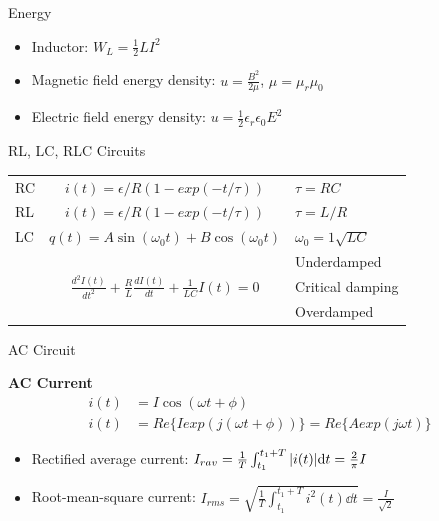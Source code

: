 \documentclass[9pt]{beamer}
\begin{document}
\begin{frame}{Energy}
    \begin{itemize}
        \item Inductor: $W_L = \frac{1}{2} L I^2$
        \item Magnetic field energy density: $u = \frac{B^2}{2 \mu}$, $\mu=\mu_r\mu_0$
        \item Electric field energy density: $u=\frac{1}{2}\epsilon_r\epsilon_0E^2$
    \end{itemize}
\end{frame}

\begin{frame}{RL, LC, RLC Circuits}
    \begin{table}[htbp]
        \centering
        \begin{tabular}{l c l}
            \toprule
            RC & $i(t)=\epsilon/R(1-exp(-t/\tau))$ & $\tau=RC$ \\ \addlinespace[1em]
            RL & $i(t)=\epsilon/R(1-exp(-t/\tau))$ & $\tau=L/R$ \\ \addlinespace[1em] 
            LC & $q(t) = A\sin(\omega_0 t) + B\cos(\omega_0 t)$ & $\omega_0 = 1\sqrt{LC}$\\ \addlinespace[1em]
            \multirow{3}{*}{RLC} & \multirow{3}{*}{$\frac{d^{2} I(t)}{d t^{2}}+\frac{R}{L} \frac{d I(t)}{d t}+\frac{1}{L C} I(t)=0$} & Underdamped \\ 
            &&Critical damping \\
            &&Overdamped \\
            \bottomrule
        \end{tabular}
    \end{table}
\end{frame}

\begin{frame}{AC Circuit}
    \begin{beamerboxesrounded}[shadow=true]{\bf AC Current}
        \begin{align}
            i(t) &= I\cos(\omega t + \phi) \\
            i(t) &= \mathit{Re}\{ I exp(j(\omega t + \phi))\} = \mathit{Re}\{ A exp(j\omega t)\}
        \end{align}
    \end{beamerboxesrounded}
    \vspace{.5em}
    \begin{itemize}
        \item Rectified average current: $I_{rav} = \frac{1}{T}\int_{t_1}^{t_1+T}\abs{i(t)}\dd t = \frac{2}{\pi}I$
        \item Root-mean-square current: $I_{rms} = \sqrt{\frac{1}{T}\int_{t_1}^{t_1+T}i^2(t)\dd t} = \frac{I}{\sqrt{2}}$
    \end{itemize}
\end{frame}
\end{document}
